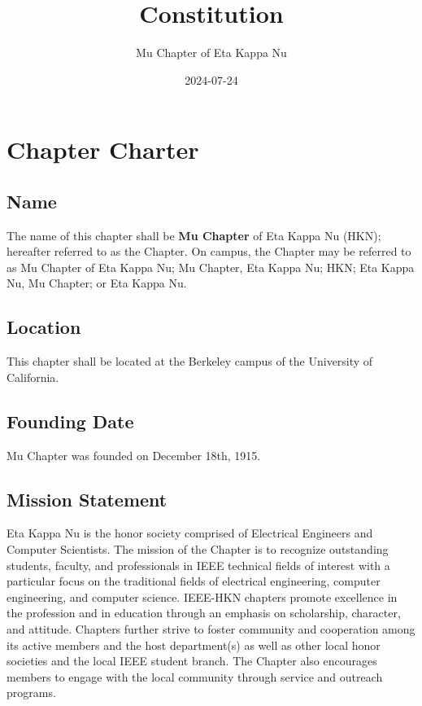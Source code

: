 \documentclass[11pt]{article}
\author{Mu Chapter of Eta Kappa Nu}
\date{2024-07-24}
\title{Constitution}
\begin{document}
\maketitle
\tableofcontents


\section{Chapter Charter}
\label{sec:org606f6bc}

\subsection{Name}
\label{sec:org2a4f184}

The name of this chapter shall be \textbf{\textbf{Mu Chapter}} of Eta Kappa Nu (HKN); hereafter referred to as the Chapter.
On campus, the Chapter may be referred to as Mu Chapter of Eta Kappa Nu; Mu Chapter, Eta Kappa Nu; HKN; Eta Kappa Nu, Mu Chapter; or Eta Kappa Nu.

\subsection{Location}
\label{sec:orgf18223d}

This chapter shall be located at the Berkeley campus of the University of California.

\subsection{Founding Date}
\label{sec:org7d0b1e0}

Mu Chapter was founded on December 18th, 1915.

\subsection{Mission Statement}
\label{sec:org7b46d92}

Eta Kappa Nu is the honor society comprised of Electrical Engineers and Computer Scientists.
The mission of the Chapter is to recognize outstanding students, faculty, and professionals in IEEE technical fields of interest with a particular focus on the traditional fields of electrical engineering, computer engineering, and computer science.
IEEE-HKN chapters promote excellence in the profession and in education through an emphasis on scholarship, character, and attitude.
Chapters further strive to foster community and cooperation among its active members and the host department(s) as well as other local honor societies and the local IEEE student branch.
The Chapter also encourages members to engage with the local community through service and outreach programs.
\end{document}
